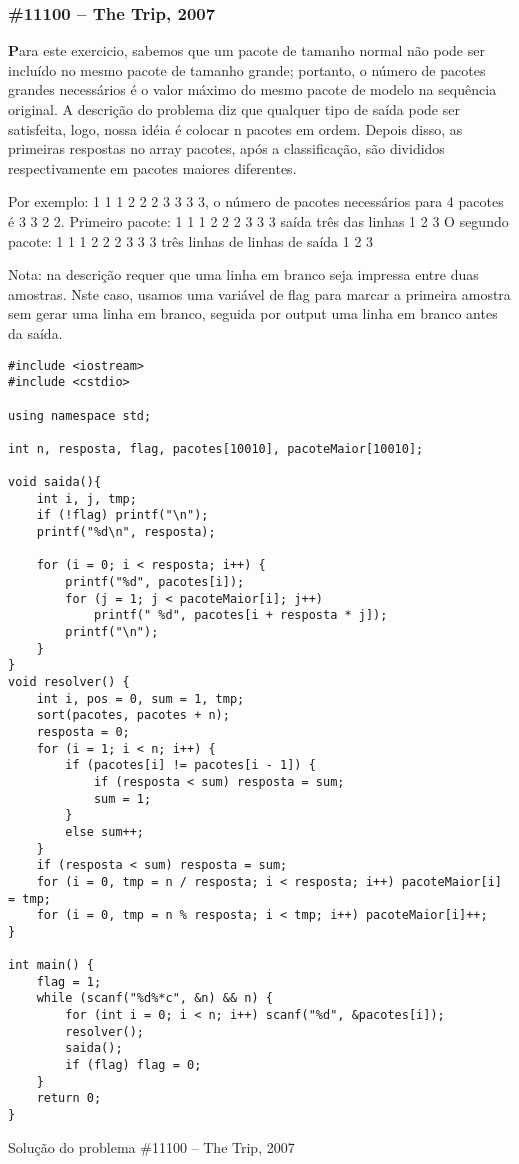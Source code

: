 \documentclass[a4paper,12pt]{scrartcl}
\begin{document}
\subsubsection{\#11100 – The Trip, 2007}
\textbf Para este exercicio, sabemos que um pacote de tamanho normal não pode ser incluído no mesmo pacote de tamanho grande; portanto, o número de pacotes grandes necessários é o valor máximo do mesmo pacote de modelo na sequência original.
A descrição do problema diz que qualquer tipo de saída pode ser satisfeita, logo, nossa idéia é colocar n pacotes em ordem. 
Depois disso, as primeiras respostas no array pacotes, após a classificação, são divididos respectivamente em pacotes maiores diferentes.

Por exemplo: 1 1 1 2 2 2 3 3 3 3, o número de pacotes necessários para 4 pacotes é 3 3 2 2. 
Primeiro pacote: 1 1 1 2 2 2 3 3 3 saída três das linhas 1 2 3 
O segundo pacote: 1 1 1 2 2 2 3 3 3 três linhas de linhas de saída 1 2 3 

Nota: na descrição requer que uma linha em branco seja impressa entre duas amostras. 
Nste caso, usamos uma variável de flag para marcar a primeira amostra sem gerar uma linha em branco, seguida por output uma linha em branco antes da saída.

\begin{listing}[H]
\begin{verbatim}
#include <iostream>
#include <cstdio>

using namespace std;

int n, resposta, flag, pacotes[10010], pacoteMaior[10010];

void saida(){
    int i, j, tmp;
    if (!flag) printf("\n");
    printf("%d\n", resposta);

    for (i = 0; i < resposta; i++) {
        printf("%d", pacotes[i]);
        for (j = 1; j < pacoteMaior[i]; j++)
            printf(" %d", pacotes[i + resposta * j]);
        printf("\n");
    }
}
void resolver() {
    int i, pos = 0, sum = 1, tmp;
    sort(pacotes, pacotes + n);
    resposta = 0;
    for (i = 1; i < n; i++) {
        if (pacotes[i] != pacotes[i - 1]) {
            if (resposta < sum) resposta = sum;
            sum = 1;
        }
        else sum++;
    }
    if (resposta < sum) resposta = sum;
    for (i = 0, tmp = n / resposta; i < resposta; i++) pacoteMaior[i] = tmp;
    for (i = 0, tmp = n % resposta; i < tmp; i++) pacoteMaior[i]++;
}

int main() {
    flag = 1;
    while (scanf("%d%*c", &n) && n) {
        for (int i = 0; i < n; i++) scanf("%d", &pacotes[i]);
        resolver();
        saida();
        if (flag) flag = 0;
    }
    return 0;
}
\end{verbatim}
\caption{\footnotesize{Solução do problema \#11100 – The Trip, 2007}}
\end{listing}
\end{document}
